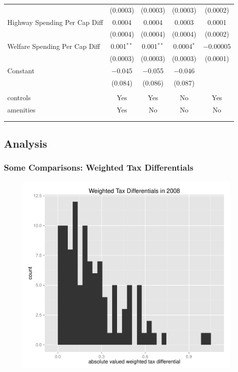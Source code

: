 \documentclass{beamer}
\begin{document}
\begin{frame}
\begin{table}[!htbp]
{{\begin{tabular}{@{\extracolsep{5pt}}lcccc}
  & (0.0003) & (0.0003) & (0.0003) & (0.0002) \\ 
  Highway Spending Per Cap Diff & 0.0004 & 0.0004 & 0.0003 & 0.0001 \\ 
  & (0.0004) & (0.0004) & (0.0004) & (0.0002) \\ 
  Welfare Spending Per Cap Diff & 0.001$^{**}$ & 0.001$^{**}$ & 0.0004$^{*}$ & $-$0.00005 \\ 
  & (0.0003) & (0.0003) & (0.0003) & (0.0001) \\ 
  Constant & $-$0.045 & $-$0.055 & $-$0.046 &  \\ 
  & (0.084) & (0.086) & (0.087) &  \\ 
 \hline \\[-1.8ex] 
controls & Yes & Yes & No & Yes \\ 
amenities & Yes & No & No & No \\ 
\hline \\[-1.8ex] 
\hline 
\hline \\[-1.8ex] 
\end{tabular}}}
\end{table} 
\end{frame}


\begin{frame}
\section{Analysis}
\frametitle{Some Comparisons: Weighted Tax Differentials}
\begin{figure}[h]\label{weightedtax}
    \centering
    \includegraphics[scale = 0.5]{../../analysis/output/_--_weightedtax.pdf}
\end{figure}
\end{frame}
\end{document}
